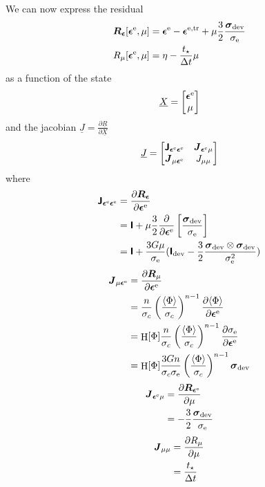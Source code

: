 \documentclass[a4paper,11pt]{article}
\newcommand{\tf}[1]{\text{\boldmath $\sf #1$}}
\newcommand{\ts}[1]{\text{\boldmath $#1$}}
\newcommand{\pderiv}[2]{\frac{\partial #1}{\partial #2}}
\newcommand{\dev}{{\rm dev}}
\newcommand{\rme}{{\rm e}}
\DeclareMathOperator*{\Heaviside}{H}
\begin{document}
We can now express the residual
\begin{align}
 \ts R_{\ts\epsilon}[\ts\epsilon^\rme,\mu] &= \ts\epsilon^\rme - \ts\epsilon^{\rm e,tr} + \mu \frac32 \frac{\ts\sigma_\dev}{\sigma_\rme}\\
 R_{\mu}[\ts\epsilon^\rme,\mu] &= \eta - \frac{t_\star}{\Delta t}\mu
\end{align}
as a function of the state 
\begin{align}
 \underline{X} = \begin{bmatrix}\ts\epsilon^\rme \\ \mu \end{bmatrix}
\end{align}
and the jacobian $\underline{J} = \pderiv{\underline{R}}{\underline{X}}$
\begin{align}
 \underline{J} = \begin{bmatrix} \tf J_{\ts\epsilon^\rme\ts\epsilon^\rme} & \ts J_{\ts\epsilon^\rme\mu} \\
                                 \ts J_{\mu\ts\epsilon^\rme}                 & J_{\mu\mu}\end{bmatrix}
\end{align}
where 
\begin{align}
\nonumber \tf J_{\ts\epsilon^\rme\ts\epsilon^\rme} &= \pderiv{\ts R_{\ts\epsilon}}{\ts\epsilon^\rme} \\
\nonumber &= \tf I + \mu \frac32 \pderiv{}{\ts\epsilon^\rme}\left[\frac{\ts\sigma_\dev}{\sigma_\rme}\right]\\
          &= \tf I + \frac{3 G \mu}{\sigma_\rme}(\tf I_\dev -\frac32\frac{\ts\sigma_\dev\otimes\ts\sigma_\dev}{\sigma_\rme^2})
\end{align}
\begin{align}
\nonumber \ts J_{\mu\ts\epsilon^\rme} &= \pderiv{\ts R_{\mu}}{\ts\epsilon^\rme} \\
\nonumber &= \frac{n}{\sigma_c} \left(\frac{\langle\Phi\rangle}{\sigma_c}\right)^{n-1} \pderiv{\langle\Phi\rangle}{\ts\epsilon^\rme}\\
\nonumber &= \Heaviside[\Phi]\frac{n}{\sigma_c} \left(\frac{\langle\Phi\rangle}{\sigma_c}\right)^{n-1} \pderiv{\sigma_\rme}{\ts\epsilon^{\rm e}}\\
 		  &= \Heaviside[\Phi]\frac{3 G n}{\sigma_c\sigma_\rme} \left(\frac{\langle\Phi\rangle}{\sigma_c}\right)^{n-1} \ts\sigma_\dev 		  
\end{align}
\begin{align}
\nonumber \ts J_{\ts\epsilon^\rme\mu} &= \pderiv{\ts R_{\ts\epsilon^\rme}}{\mu} \\
 &= -\frac32\frac{\ts\sigma_\dev}{\sigma_\rme}
\end{align}
\begin{align}
\nonumber \ts J_{\mu\mu} &= \pderiv{R_\mu}{\mu}\\
 &= \frac{t_\star}{\Delta t}
\end{align}
\end{document}
